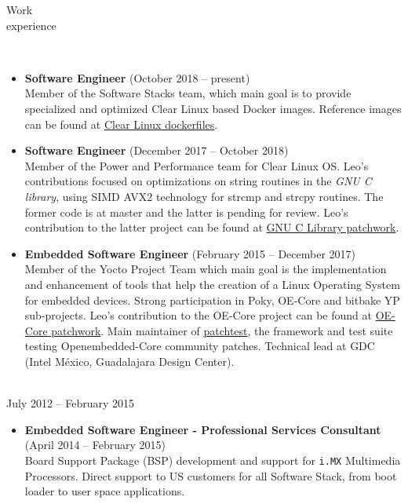\documentclass{resume}
\begin{document}
\begin{category}{Work \\experience}

\\

\begin{itemize}
\item \textbf{Software Engineer} (October 2018 -- present)\\
  Member of the Software Stacks team, which main goal is to provide
  specialized and optimized Clear Linux based Docker images. Reference images
  can be found at \href{https://github.com/clearlinux/dockerfiles}{Clear Linux
  dockerfiles}.
\end{itemize}


\begin{itemize}
\item \textbf{Software Engineer} (December 2017 -- October 2018)\\
  Member of the Power and Performance team for Clear Linux OS. Leo's
  contributions focused on optimizations on string routines in the \textit{GNU
    C library}, using SIMD AVX2 technology for strcmp and strcpy routines. The
  former code is at master and the latter is pending for review. Leo's
  contribution to the latter project can be found at
  \href{https://patchwork.ozlabs.org/project/glibc/list/?submitter=74072}{GNU
    C Library patchwork}.
\end{itemize}

\begin{itemize}
\item \textbf{Embedded Software Engineer} (February 2015 -- December 2017)\\
  Member of the Yocto Project Team which main goal is the implementation and
  enhancement of tools that help the creation of a Linux Operating System
  for embedded devices. Strong participation in Poky, OE-Core and bitbake
  YP sub-projects. Leo's contribution to the OE-Core project can be found at
  \href{https://patchwork.openembedded.org/project/oe-core/series/?ordering=-last_
    updated}{OE-Core patchwork}. Main maintainer of
  \href{http://git.yoctoproject.org/cgit/cgit.cgi/patchtest/}{patchtest}, the
  framework and test suite testing Openembedded-Core 
  community patches. Technical lead at GDC (Intel M\'exico, Guadalajara Design Center).
\end{itemize}

\\
July 2012 -- February 2015
\begin{itemize}
\item \textbf{Embedded Software Engineer - Professional Services Consultant} (April 2014 -- February 2015)\\
  Board Support Package (BSP) development and support for \texttt{i.MX}
  Multimedia Processors. Direct support to US customers for all Software
  Stack, from boot loader to user space applications.
\end{itemize}


\end{category}
\end{document}
